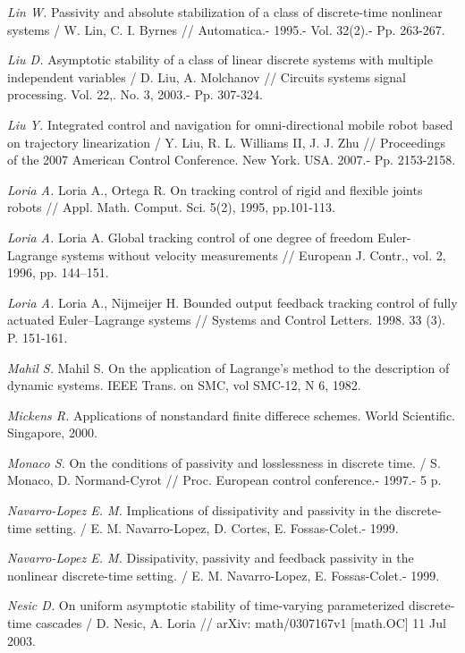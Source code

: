 \begin{thebibliography}{10}
	{\it Lin W.} Passivity and absolute stabilization of a class of discrete-time nonlinear systems / W. Lin, C. I. Byrnes // Automatica.- 1995.- Vol. 32(2).- Pp. 263-267.
	
	{\it Liu D.} Asymptotic stability of a class of linear discrete systems with multiple independent variables / D. Liu, A. Molchanov // Circuits systems signal processing. Vol. 22,. No. 3, 2003.- Pp. 307-324.
	
	{\it Liu Y.} Integrated control and navigation for omni-directional mobile robot based on trajectory linearization / Y. Liu, R. L. Williams II, J. J. Zhu // Proceedings of the 2007 American Control Conference. New York. USA. 2007.- Pp. 2153-2158.
	
	{\it Loria A.} Loria A., Ortega R. On tracking control of rigid and flexible joints robots // Appl. Math. Comput. Sci. 5(2), 1995, pp.101-113.
	
	{\it Loria A.} Loria A. Global tracking control of one degree of freedom Euler-Lagrange systems without velocity measurements // European J. Contr., vol. 2, 1996, pp. 144–151.
	
	{\it Loria A.} Loria A., Nijmeijer H. Bounded output feedback tracking control of fully actuated Euler–Lagrange systems // Systems and Control Letters. 1998. 33 (3). P. 151-161.
	
	{\it Mahil S.} Mahil S. On the application of Lagrange's method to the description of dynamic systems. IEEE Trans. on SMC, vol SMC-12, N 6, 1982.
	
	{\it Mickens R.} Applications of nonstandard finite differece schemes. World Scientific. Singapore, 2000.
	
	{\it Monaco S.} On the conditions of passivity and losslessness in discrete time. / S. Monaco, D. Normand-Cyrot // Proc. European control conference.- 1997.- 5 p.
	
	{\it Navarro-Lopez E. M.} Implications of dissipativity and passivity in the discrete-time setting. / E. M. Navarro-Lopez, D. Cortes, E. Fossas-Colet.- 1999.
	
	{\it Navarro-Lopez E. M.} Dissipativity, passivity and feedback passivity in the nonlinear discrete-time setting. / E. M. Navarro-Lopez, E. Fossas-Colet.- 1999.
	
	{\it Nesic D.} On uniform asymptotic stability of time-varying parameterized discrete-time cascades / D. Nesic, A. Loria // arXiv: math/0307167v1 [math.OC] 11 Jul 2003.
	

\end{thebibliography}
